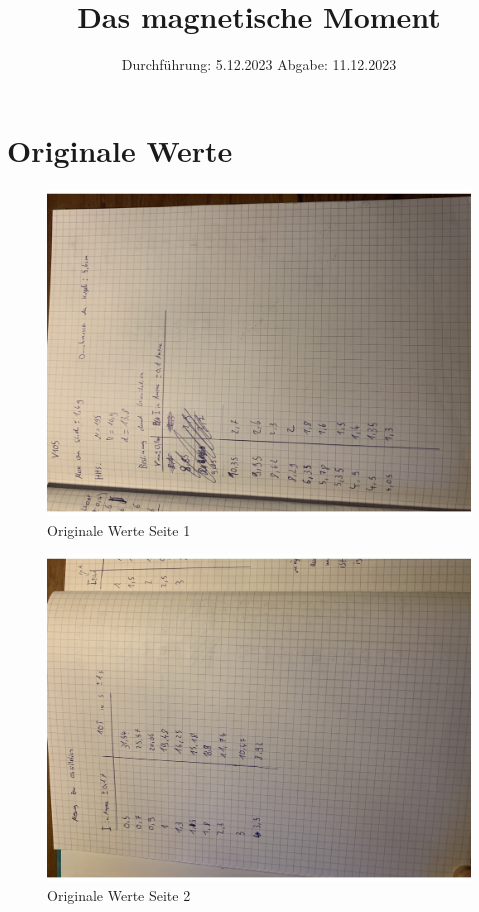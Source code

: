 

\subject{V105}
\title{Das magnetische Moment}
\date{%
  Durchführung: 5.12.2023
  \hspace{3em}
  Abgabe: 11.12.2023
}



\maketitle
\thispagestyle{empty}
\tableofcontents
\newpage






\printbibliography{}

\section{Originale Werte}
\begin{figure}
\centering
\includegraphics[width = 15cm]{V105foto1.pdf}
\caption{Originale Werte Seite 1}
\end{figure}
\begin{figure}
  \centering
  \includegraphics[width = 15cm]{V105foto2.pdf}
  \caption{Originale Werte Seite 2}
\end{figure}
